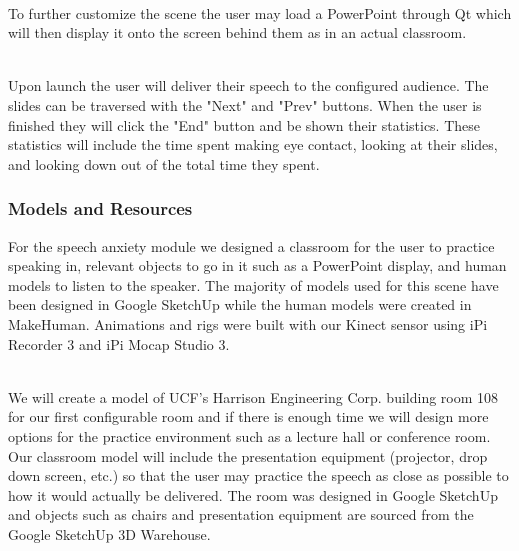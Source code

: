 \documentclass[a4paper,10pt]{article}
\begin{document}
\par~\\
To further customize the scene the user may load a PowerPoint through Qt which will then display it onto the screen behind them as in an actual classroom.

\par~\\
Upon launch the user will deliver their speech to the configured audience. The slides can be traversed with the "Next" and "Prev" buttons. When the user is finished they will click the "End" button and be shown their statistics. These statistics will include the time spent making eye contact, looking at their slides, and looking down out of the total time they spent.

\subsubsection{Models and Resources}
For the speech anxiety module we designed a classroom for the user to practice speaking in, relevant objects to go in it such as a PowerPoint display, and human models to listen to the speaker. The majority of models used for this scene have been designed in Google SketchUp while the human models were created in MakeHuman. Animations and rigs were built with our Kinect sensor using iPi Recorder 3 and iPi Mocap Studio 3.

\par~\\
We will create a model of UCF's Harrison Engineering Corp. building room 108 for our first configurable room and if there is enough time we will design more options for the practice environment such as a lecture hall or conference room. Our classroom model will include the presentation equipment (projector, drop down screen, etc.) so that the user may practice the speech as close as possible to how it would actually be delivered. The room was designed in Google SketchUp and objects such as chairs and presentation equipment are sourced from the Google SketchUp 3D Warehouse.
\end{document}
